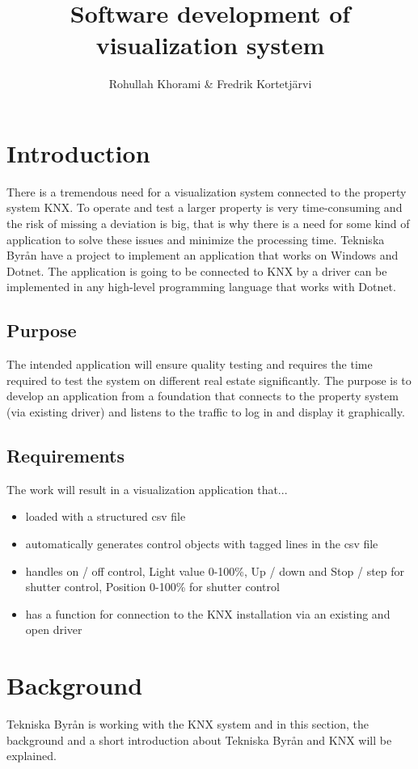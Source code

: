 \documentclass{article}
\title{Software development of visualization system}
\author{Rohullah Khorami \& Fredrik Kortetjärvi}
\begin{document}
\maketitle
\newpage
\tableofcontents
\newpage
\section{Introduction}
There is a tremendous need for a visualization system connected to the property system KNX. To operate and test a larger property is very time-consuming and the risk of missing a deviation is big, that is why there is a need for some kind of application to solve these issues and minimize the processing time. Tekniska Byrån have a project to implement an application that works on Windows and Dotnet. The application is going to be connected to KNX by a driver can be implemented in any high-level programming language that works with Dotnet.
\subsection{Purpose}
The intended application will ensure quality testing and requires the time required to test the system on different real estate significantly. The purpose is to develop an application from a foundation that connects to the property system (via existing driver) and listens to the traffic to log in and display it graphically.
\subsection{Requirements}
The work will result in a visualization application that...
\begin{itemize}
    \item loaded with a structured csv file
    \item automatically generates control objects with tagged lines in the csv file
    \item handles on / off control, Light value 0-100\%, Up / down and Stop / step for shutter control, Position 0-100\% for shutter control
    \item has a function for connection to the KNX installation via an existing and open driver
\end{itemize}
\section{Background}
Tekniska Byrån is working with the KNX system and in this section, the background and a short introduction about Tekniska Byrån and KNX will be explained.
\end{document}
